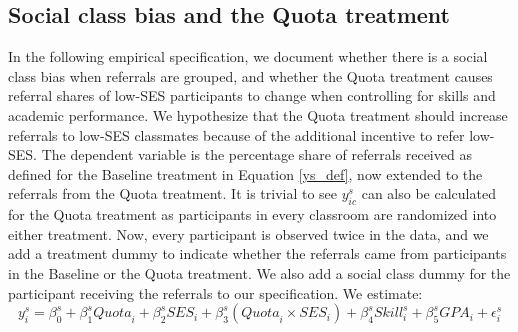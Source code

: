 \documentclass[11pt,a4paper,oneside]{article}
\begin{document}
 \subsection*{Social class bias and the Quota treatment}
  In the following empirical specification, we document whether there is a social class bias when referrals are grouped, and whether the Quota treatment causes referral shares of low-SES participants to change when controlling for skills and academic performance. We hypothesize that the Quota treatment should increase referrals to low-SES classmates because of the additional incentive to refer low-SES. The dependent variable is the percentage share of referrals received as defined for the Baseline treatment in Equation \ref{ys_def}, now extended to the referrals from the Quota treatment. It is trivial to see $y_{ic}^{s}$ can also be calculated for the Quota treatment as participants in every classroom are randomized into either treatment. Now, every participant is observed twice in the data, and we add a treatment dummy to indicate whether the referrals came from participants in the Baseline or the Quota treatment. We also add a social class dummy for the participant receiving the referrals to our specification. We estimate:
  \begin{equation}\label{treat-ses-int}
y_{i}^{s} = \beta_{0}^{s} + \beta_1^{s}{Quota}_{i} + \beta_2^{s}{SES}_{i} + \beta_3^{s}({Quota}_{i} \times {SES}_{i}) + \beta_{4}^{s}{Skill}_{i}^{s} + \beta_5^{s}{GPA}_{i} + \epsilon_{i}^{s}
\end{equation}
  
\end{document}
